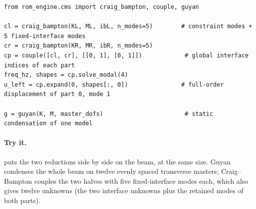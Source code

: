 \begin{lstlisting}[caption={Two Craig--Bampton halves coupled at two interface dofs (KL, ML, ibL: left half and its interface dof positions; KR, MR, ibR: right half).},label={lst:cm-run}]
from rom_engine.cms import craig_bampton, couple, guyan

cl = craig_bampton(KL, ML, ibL, n_modes=5)        # constraint modes + 5 fixed-interface modes
cr = craig_bampton(KR, MR, ibR, n_modes=5)
cp = couple([cl, cr], [[0, 1], [0, 1]])            # global interface indices of each part
freq_hz, shapes = cp.solve_modal(4)
u_left = cp.expand(0, shapes[:, 0])               # full-order displacement of part 0, mode 1

g = guyan(K, M, master_dofs)                       # static condensation of one model
\end{lstlisting}

\paragraph{Try it.}  puts the two reductions side by side on the beam, at the same size. Guyan condenses the whole beam on twelve evenly spaced transverse masters; Craig--Bampton couples the two halves with five fixed-interface modes each, which also gives twelve unknowns (the two interface unknowns plus the retained modes of both parts).

